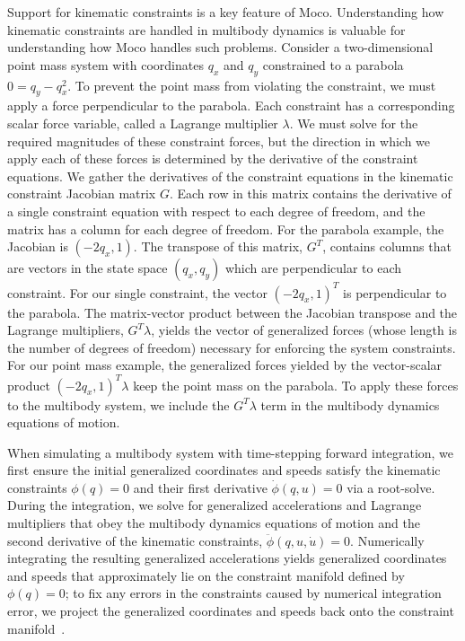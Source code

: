 \documentclass[10pt,letterpaper]{article}
\begin{document}
Support for kinematic constraints is a key feature of Moco. Understanding how kinematic constraints are handled in multibody dynamics is valuable for understanding how Moco handles such problems. Consider a two-dimensional point mass system with coordinates $q_x$ and $q_y$ constrained to a parabola $0 = q_y - q_x^2$. To prevent the point mass from violating the constraint, we must apply a force perpendicular to the parabola. Each constraint has a corresponding scalar force variable, called a Lagrange multiplier $\lambda$. We must solve for the required magnitudes of these constraint forces, but the direction in which we apply each of these forces is determined by the derivative of the constraint equations. We gather the derivatives of the constraint equations in the kinematic constraint Jacobian matrix $G$. Each row in this matrix contains the derivative of a single constraint equation with respect to each degree of freedom, and the matrix has a column for each degree of freedom. For the parabola example, the Jacobian is $( -2q_x, 1)$. The transpose of this matrix, $G^T$, contains columns that are vectors in the state space $(q_x, q_y)$ which are perpendicular to each constraint. For our single constraint, the vector $(-2q_x, 1)^T$ is perpendicular to the parabola. The matrix-vector product between the Jacobian transpose and the Lagrange multipliers, $G^T \lambda$, yields the vector of generalized forces (whose length is the number of degrees of freedom) necessary for enforcing the system constraints. For our point mass example, the generalized forces yielded by the vector-scalar product  $(-2q_x, 1)^T \lambda$ keep the point mass on the parabola. To apply these forces to the multibody system, we include the $G^T \lambda$ term in the multibody dynamics equations of motion.

When simulating a multibody system with time-stepping forward integration, we first ensure the initial generalized coordinates and speeds satisfy the kinematic constraints $\phi(q) = 0$ and their first derivative $\dot{\phi}(q, u) = 0$ via a root-solve. During the integration, we solve for generalized accelerations and Lagrange multipliers that obey the multibody dynamics equations of motion and the second derivative of the kinematic constraints, $\ddot{\phi}(q, u, \dot{u}) = 0$. Numerically integrating the resulting generalized accelerations yields generalized coordinates and speeds that approximately lie on the constraint manifold defined by $\phi(q) = 0$; to fix any errors in the constraints caused by numerical integration error, we project the generalized coordinates and speeds back onto the constraint manifold~\cite{Sherman:2011byc}.
\end{document}
